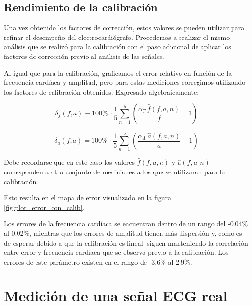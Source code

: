\documentclass[conference]{IEEEtran}
\begin{document}
\subsection{Rendimiento de la calibración}

Una vez obtenido los factores de corrección, estos valores se pueden utilizar
para refinar el desempeño del electrocardiógrafo. Procedemos a
realizar el mismo análisis que se realizó para la calibración con el paso
adicional de aplicar los factores de corrección previo al análisis de las
señales.

Al igual que para la calibración, graficamos el error relativo en función de 
la frecuencia cardíaca y amplitud, pero para estas mediciones corregimos
utilizando los factores de calibración obtenidos. Expresado algebraicamente:

$$ \delta_{f} \left(f, a\right) = 100 \% ~ \cdot \dfrac{1}{5} \sum_{n=1}^{5}
\left( \dfrac{\alpha_T ~ \hat{f}(f,a,n)}{f} - 1\right)$$
 

$$ \delta_{a} \left(f, a\right) = 100 \% ~ \cdot \dfrac{1}{5} \sum_{n=1}^{5}
\left( \dfrac{\alpha_A ~ \hat{a}(f,a,n)}{a} - 1\right)$$

Debe recordarse que en este caso los valores $\hat{f}(f,a,n)$ y $\hat{a}(f,a,n)$
corresponden a otro conjunto de mediciones a los que se utilizaron para la
calibración.

Esto resulta en el mapa de error visualizado en la figura
\ref{fig:plot_error_con_calib}.

Los errores de la frecuencia cardíaca se encuentran dentro de un rango del
-0.04\% al 0.02\%, mientras que los errores de amplitud tienen más dispersión y,
como es de esperar debido a que la calibración es lineal, siguen manteniendo la
correlación entre error y frecuencia cardíaca que se observó previo a la
calibración. Los errores de este parámetro existen en el rango de -3.6\% al
2.9\%.
 
\newpage


\section{Medición de una señal ECG real}
\end{document}
